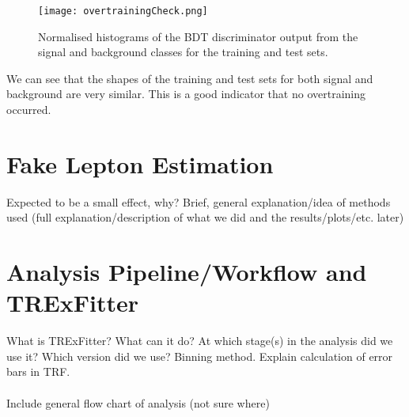 \begin{figure}[h!]
	\texttt{[image: overtrainingCheck.png]}
	\centering
	\caption{Normalised histograms of the BDT discriminator output from the signal and background classes for the training and test sets.}
	\label{fig:bdt-overtrain-check}
\end{figure}

We can see that the shapes of the training and test sets for both signal and background are very similar. This is a good indicator that no overtraining occurred.




\section{Fake Lepton Estimation} 
Expected to be a small effect, why? Brief, general explanation/idea of methods used (full explanation/description of what we did and the results/plots/etc. later) 
\section{Analysis Pipeline/Workflow and TRExFitter}
What is TRExFitter? What can it do? At which stage(s) in the analysis did we use it? Which version did we use? Binning method. Explain calculation of error bars in TRF. \\\\ 
Include general flow chart of analysis (not sure where)

